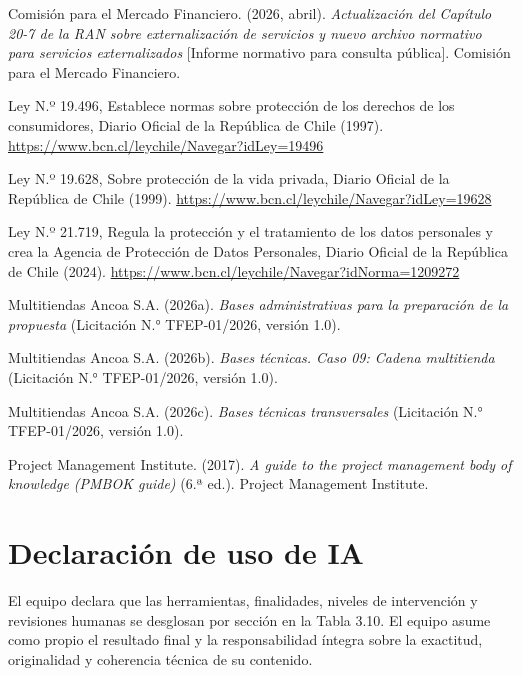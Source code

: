 \documentclass[11pt]{article}
\begin{document}
Comisión para el Mercado Financiero. (2026, abril). \textit{Actualización del Capítulo 20-7 de la RAN sobre externalización de servicios y nuevo archivo normativo para servicios externalizados} [Informe normativo para consulta pública]. Comisión para el Mercado Financiero.

Ley N.º 19.496, Establece normas sobre protección de los derechos de los consumidores, Diario Oficial de la República de Chile (1997). \url{https://www.bcn.cl/leychile/Navegar?idLey=19496}

Ley N.º 19.628, Sobre protección de la vida privada, Diario Oficial de la República de Chile (1999). \url{https://www.bcn.cl/leychile/Navegar?idLey=19628}

Ley N.º 21.719, Regula la protección y el tratamiento de los datos personales y crea la Agencia de Protección de Datos Personales, Diario Oficial de la República de Chile (2024). \url{https://www.bcn.cl/leychile/Navegar?idNorma=1209272}

Multitiendas Ancoa S.A. (2026a). \textit{Bases administrativas para la preparación de la propuesta} (Licitación N.° TFEP-01/2026, versión 1.0).

Multitiendas Ancoa S.A. (2026b). \textit{Bases técnicas. Caso 09: Cadena multitienda} (Licitación N.° TFEP-01/2026, versión 1.0).

Multitiendas Ancoa S.A. (2026c). \textit{Bases técnicas transversales} (Licitación N.° TFEP-01/2026, versión 1.0).

Project Management Institute. (2017). \textit{A guide to the project management body of knowledge (PMBOK guide)} (6.ª ed.). Project Management Institute.

\section*{Declaración de uso de IA}

El equipo declara que las herramientas, finalidades, niveles de intervención y revisiones humanas se desglosan por sección en la Tabla 3.10. El equipo asume como propio el resultado final y la responsabilidad íntegra sobre la exactitud, originalidad y coherencia técnica de su contenido.
\end{document}
